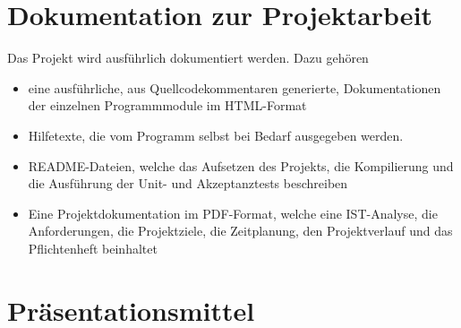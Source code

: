 \documentclass[a4paper,11pt]{article}
\begin{document}
\section{Dokumentation zur Projektarbeit}
Das Projekt wird ausführlich dokumentiert werden. Dazu gehören
\begin{itemize}
	\item eine ausführliche, aus Quellcodekommentaren generierte, Dokumentationen
	      der einzelnen Programmmodule im HTML-Format
	\item Hilfetexte, die vom Programm selbst bei Bedarf ausgegeben werden.
	\item README-Dateien, welche das Aufsetzen des Projekts, die Kompilierung
	      und die Ausführung der Unit- und Akzeptanztests beschreiben
	\item Eine Projektdokumentation im PDF-Format, welche eine IST-Analyse,
	      die Anforderungen, die Projektziele, die Zeitplanung, den Projektverlauf
	      und das Pflichtenheft beinhaltet
\end{itemize}

\section{Präsentationsmittel}
\end{document}
